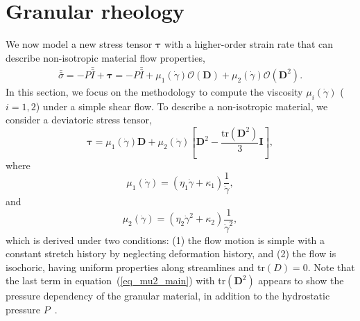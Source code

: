 \section{Granular rheology}
We now model a new stress tensor $\bm \tau$ with a higher-order strain rate that can describe non-isotropic material flow properties,
\begin{align}
  \bar{\bar{\sigma}}
    = -P \bar{\bar{I}}  + \bm{\tau}
    =  -P \bar{\bar{I}}  
    + \mu_1(\dot{\gamma}) \mathcal{O}({\bm D})
    + \mu_2(\dot{\gamma}) \mathcal{O}({\bm D^2}).
  \end{align}
In this section, we focus on the methodology to compute the viscosity $\mu_i ({\dot{\gamma}})$ ($i = 1,2$) under a simple shear flow. 
To describe a non-isotropic material, we consider a deviatoric stress tensor,
\begin{equation}
  {\bm {\bm \tau}}
  = \mu_1(\dot{\gamma}) {\bm D}
  +  
 \mu_2 (\dot{\gamma})
  \left[ {\bm D}^2  - \frac{\text{tr}\left({\bm D}^2\right)}{3}{\bm I} \right],
\label{eq_2ndOrder_tau}
\end{equation}
where 
\begin{equation}
  \mu_1 (\dot{\gamma})
   = \left( \eta_1 \dot{\gamma}+ \kappa_1 \right) \frac{1}{\dot{\gamma}},
\label{eq_mu1_main}
\end{equation}
and 
\begin{equation}
  \mu_2 (\dot{\gamma}) = 
  \left( \eta_2  \dot{\gamma}^2
  +  \kappa_2 
  \right) \frac{1}{\dot{\gamma}^2},
  \label{eq_mu2_main}
\end{equation}
which is derived under two conditions:
(1) the flow motion is simple with a constant stretch history by neglecting deformation history, and (2) the flow is isochoric, having uniform properties along streamlines and tr$(D) = 0$. 
Note that the last term in equation~(\ref{eq_mu2_main}) with tr$\left( \bm D^2 \right)$ appears to show the pressure dependency of the granular material, in addition to the hydrostatic pressure $P$~\cite{rajagopal_implicit_2006}.




